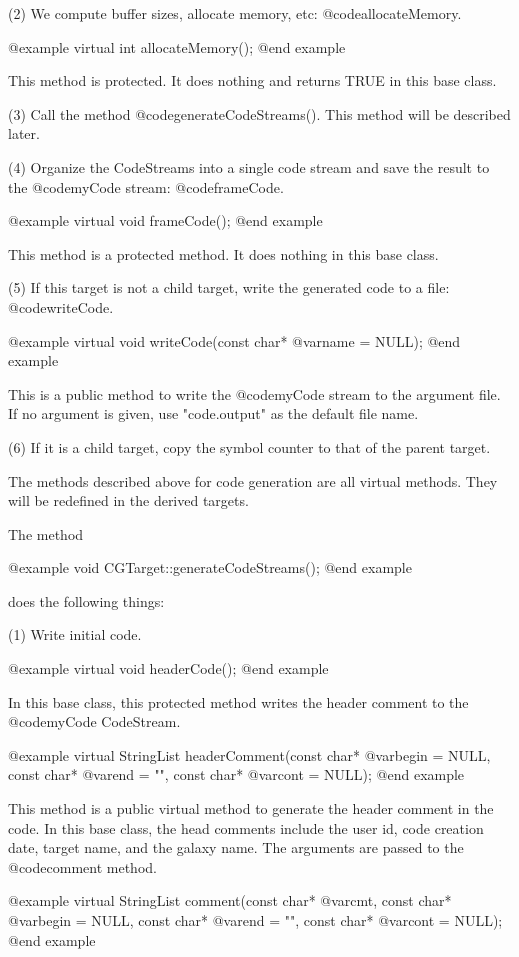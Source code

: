(2) We compute buffer sizes, allocate memory, etc: @code{allocateMemory}.

@example
virtual int allocateMemory();
@end example

This method is protected. It does nothing and returns TRUE in this
base class.

(3) Call the method @code{generateCodeStreams()}.  This method will be
described later.

(4) Organize the CodeStreams into a single code stream and save the result
to the @code{myCode} stream: @code{frameCode}.

@example
virtual void frameCode();
@end example

This method is a protected method. It does nothing in this base
class.

(5) If this target is not a child target, write the generated code
to a file: @code{writeCode}.

@example
virtual void writeCode(const char* @var{name} = NULL);
@end example

This is a public method to write the @code{myCode} stream to the argument
file. If no argument is given, use "code.output" as the default file
name.

(6) If it is a child target, copy the symbol counter to that of
the parent target.

The methods described above for code generation are all virtual
methods.  They will be redefined in the derived targets.

The method 
   
@example
void CGTarget::generateCodeStreams();
@end example
   
does the following things:

(1) Write initial code.

@example
virtual void headerCode();
@end example

In this base class, this protected method writes the  header comment
to the @code{myCode} CodeStream.

@example
virtual StringList headerComment(const char* @var{begin} = NULL, const char*
@var{end} = "", const char* @var{cont} = NULL);
@end example

This method is a public virtual method to generate the header
comment in the code. In this base class, the head comments include the
user id, code creation date, target name, and the galaxy name. The
arguments are passed to the @code{comment} method.

@example
virtual StringList comment(const char* @var{cmt}, const char* @var{begin} = 
NULL, const char* @var{end} = "", const char* @var{cont} = NULL);
@end example

